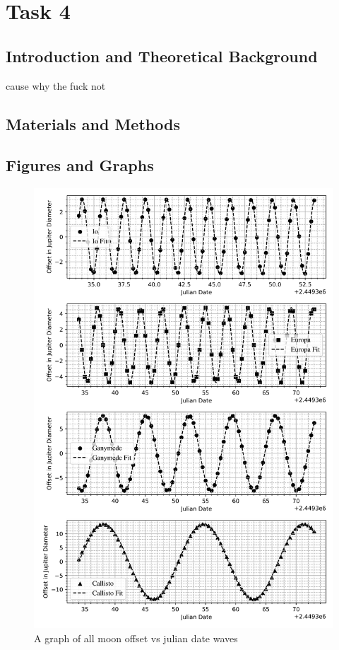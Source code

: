 \documentclass[12pt, a4paper]{article}
\begin{document}
\section{Task 4}

\subsection{Introduction and Theoretical Background}
cause why the fuck not

\subsection{Materials and Methods}

\subsection{Figures and Graphs}
\begin{figure}[H]
    \centering
    \includegraphics[width = \textwidth]{4Plot1.png}
    \caption{A graph of all moon offset vs julian date waves}
\end{figure}
\end{document}
